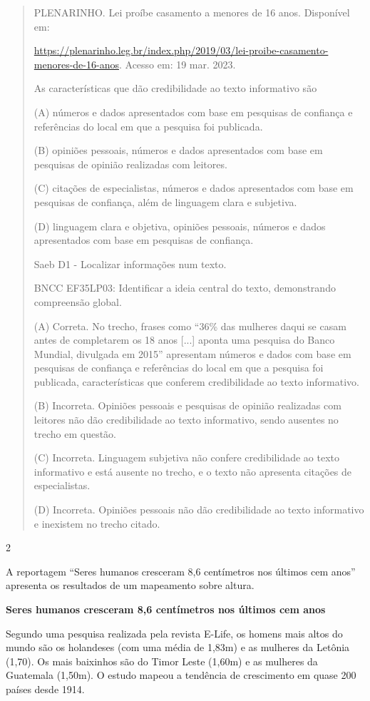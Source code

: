 \begin{escolha}
\begin{escolha}
{\begin{quote}
PLENARINHO. Lei proíbe casamento a menores de 16 anos. Disponível em:

\url{https://plenarinho.leg.br/index.php/2019/03/lei-proibe-casamento-menores-de-16-anos}.
Acesso em: 19 mar. 2023.

As características que dão credibilidade ao texto informativo são

(A) números e dados apresentados com base em pesquisas de confiança e
referências do local em que a pesquisa foi publicada.

(B) opiniões pessoais, números e dados apresentados com base em
pesquisas de opinião realizadas com leitores.

(C) citações de especialistas, números e dados apresentados com base em
pesquisas de confiança, além de linguagem clara e subjetiva.

(D) linguagem clara e objetiva, opiniões pessoais, números e dados
apresentados com base em pesquisas de confiança.

Saeb D1 - Localizar informações num texto.

BNCC EF35LP03: Identificar a ideia central do texto, demonstrando
compreensão global.

(A) Correta. No trecho, frases como ``36\% das mulheres daqui se casam
antes de completarem os 18 anos {[}...{]} aponta uma pesquisa do Banco
Mundial, divulgada em 2015'' apresentam números e dados com base em
pesquisas de confiança e referências do local em que a pesquisa foi
publicada, características que conferem credibilidade ao texto
informativo.

(B) Incorreta. Opiniões pessoais e pesquisas de opinião realizadas com
leitores não dão credibilidade ao texto informativo, sendo ausentes no
trecho em questão.

(C) Incorreta. Linguagem subjetiva não confere credibilidade ao texto
informativo e está ausente no trecho, e o texto não apresenta citações
de especialistas.

(D) Incorreta. Opiniões pessoais não dão credibilidade ao texto
informativo e inexistem no trecho citado.
\end{quote}

\num{2}

A reportagem ``Seres humanos cresceram 8,6 centímetros nos últimos cem
anos'' apresenta os resultados de um mapeamento sobre altura.

\textbf{Seres humanos cresceram 8,6 centímetros nos últimos cem anos}

Segundo uma pesquisa realizada pela revista E-Life, os homens mais altos
do mundo são os holandeses (com uma média de 1,83m) e as mulheres da
Letônia (1,70). Os mais baixinhos são do Timor Leste (1,60m) e as
mulheres da Guatemala (1,50m). O estudo mapeou a tendência de
crescimento em quase 200 países desde 1914.

}
\end{escolha}
\end{escolha}

